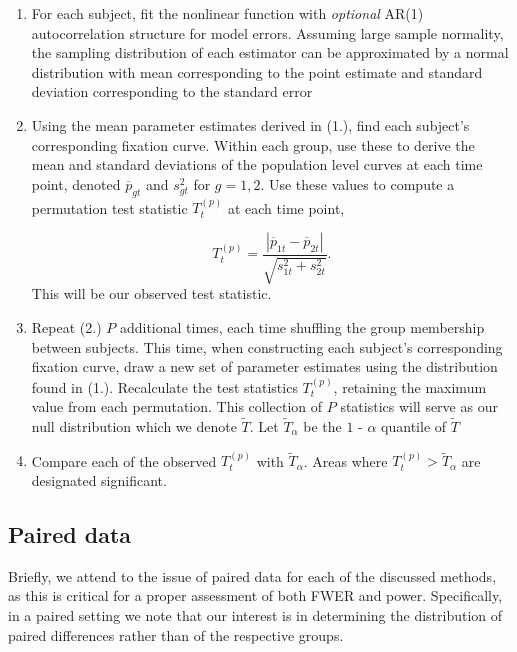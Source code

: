 \documentclass{article}
\begin{document}
\begin{enumerate}
\vspace{-2mm}
\item For each subject, fit the nonlinear function with \textit{optional} AR(1) autocorrelation structure for model errors. Assuming large sample normality, the sampling distribution of each estimator can be approximated by a normal distribution with mean corresponding to the point estimate and standard deviation corresponding to the standard error
\item Using the mean parameter estimates derived in (1.), find each subject's corresponding fixation curve. Within each group, use these to derive the mean and standard deviations of the population level curves at each time point, denoted $\overline{p}_{gt}$ and $s_{gt}^2$ for $g = 1,2$. Use these values to compute a permutation test statistic $T_t^{(p)}$ at each time point,

\begin{equation}
T_t^{(p)} = \frac{|\overline{p}_{1t} - \overline{p}_{2t}|}{\sqrt{s_{1t}^2 + s_{2t}^2}}.
\end{equation}
This will be our observed test statistic.
\item Repeat (2.) $P$  additional times, each time shuffling the group membership between subjects. This time, when constructing each subject's corresponding fixation curve, draw a new set of parameter estimates using the distribution found in (1.). Recalculate the test statistics $T_t^{(p)}$, retaining the maximum value from each permutation. This collection of $P$ statistics will serve as our null distribution which we denote $\widetilde{T}$. Let $\widetilde{T}_{\alpha}$ be the $1$ - $\alpha$ quantile of $\widetilde{T}$
\item Compare each of the observed $T_t^{(p)}$ with $\widetilde{T}_{\alpha}$. Areas where $T_t^{(p)} > \widetilde{T}_{\alpha}$ are designated significant. 
\end{enumerate}



\subsection{Paired data}

Briefly, we attend to the issue of paired data for each of the discussed methods, as this is critical for a proper assessment of both FWER and power. Specifically, in a paired setting we note that our interest is in determining the distribution of paired differences rather than of the respective groups. 
\end{document}
